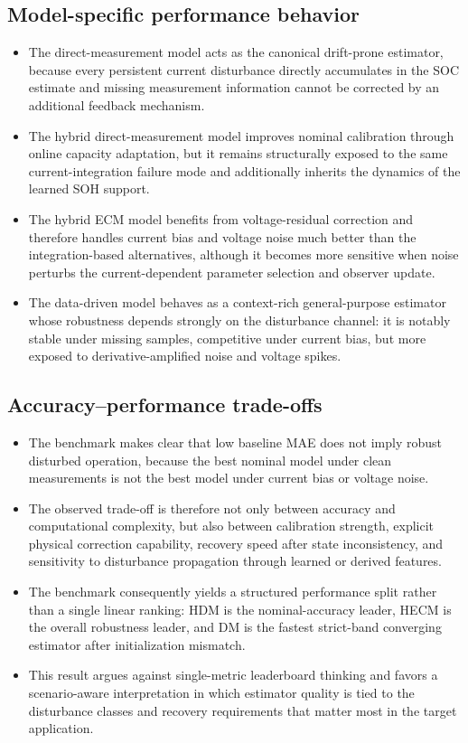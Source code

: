 \documentclass[review]{elsarticle}
\begin{document}
\subsection{Model-specific performance behavior}
\begin{itemize}[leftmargin=*]
    \item The direct-measurement model acts as the canonical drift-prone estimator, because every persistent current disturbance directly accumulates in the SOC estimate and missing measurement information cannot be corrected by an additional feedback mechanism.
    \item The hybrid direct-measurement model improves nominal calibration through online capacity adaptation, but it remains structurally exposed to the same current-integration failure mode and additionally inherits the dynamics of the learned SOH support.
    \item The hybrid ECM model benefits from voltage-residual correction and therefore handles current bias and voltage noise much better than the integration-based alternatives, although it becomes more sensitive when noise perturbs the current-dependent parameter selection and observer update.
    \item The data-driven model behaves as a context-rich general-purpose estimator whose robustness depends strongly on the disturbance channel: it is notably stable under missing samples, competitive under current bias, but more exposed to derivative-amplified noise and voltage spikes.
\end{itemize}

\subsection{Accuracy--performance trade-offs}
\begin{itemize}[leftmargin=*]
    \item The benchmark makes clear that low baseline MAE does not imply robust disturbed operation, because the best nominal model under clean measurements is not the best model under current bias or voltage noise.
    \item The observed trade-off is therefore not only between accuracy and computational complexity, but also between calibration strength, explicit physical correction capability, recovery speed after state inconsistency, and sensitivity to disturbance propagation through learned or derived features.
    \item The benchmark consequently yields a structured performance split rather than a single linear ranking: HDM is the nominal-accuracy leader, HECM is the overall robustness leader, and DM is the fastest strict-band converging estimator after initialization mismatch.
    \item This result argues against single-metric leaderboard thinking and favors a scenario-aware interpretation in which estimator quality is tied to the disturbance classes and recovery requirements that matter most in the target application.
\end{itemize}
\end{document}
